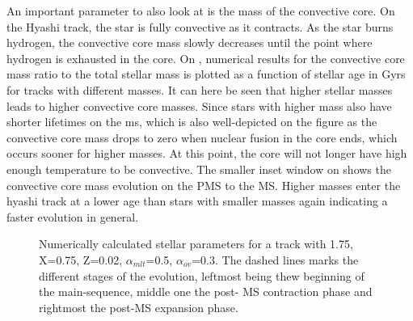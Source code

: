 An important parameter to also look at is the mass of the convective core. On the Hyashi track, the star is fully convective as it contracts. As the star burns hydrogen, the convective core mass slowly decreases until the point where hydrogen is exhausted in the core.  On , numerical results for the convective core mass ratio to the total stellar mass is plotted as a function of stellar age in Gyrs for tracks with different masses. It can here be seen that higher stellar masses leads to higher convective core masses. Since stars with higher mass also have shorter lifetimes on the ms, which is also well-depicted on the figure as the convective core mass drops to zero when nuclear fusion in the core ends, which occurs sooner for higher masses. At this point, the core will not longer have high enough temperature to be convective. The smaller inset window on  shows the convective core mass evolution on the PMS to the MS. Higher masses enter the hyashi track at a lower age than stars with smaller masses again indicating a faster evolution in general.  

\begin{figure}[htbp]
    \centering
    \caption{Numerically calculated stellar parameters for a track with 1.75\msun, X=0.75, Z=0.02, $\alpha_{mlt}$=0.5, $\alpha_{ov}$=0.3. The dashed lines marks the different stages of the evolution, leftmost being thew beginning of the main-sequence, middle one the post- MS contraction phase and rightmost the post-MS expansion phase.}
    \label{stellarparams}
\end{figure}


